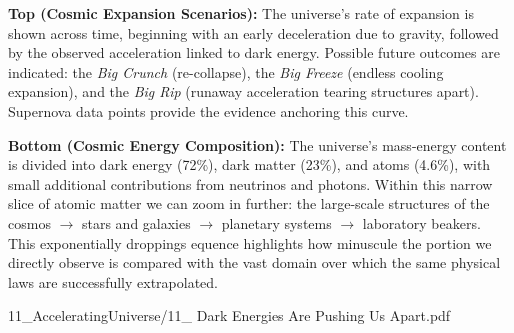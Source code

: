\begin{SideNotePage}{
  \textbf{Top (Cosmic Expansion Scenarios):} The universe’s rate of expansion is shown across time, beginning with an early deceleration due to gravity, followed by the observed acceleration linked to dark energy. Possible future outcomes are indicated: the \emph{Big Crunch} (re-collapse), the \emph{Big Freeze} (endless cooling expansion), and the \emph{Big Rip} (runaway acceleration tearing structures apart). Supernova data points provide the evidence anchoring this curve. \par
  \textbf{Bottom (Cosmic Energy Composition):} The universe’s mass-energy content is divided into dark energy (72\%), dark matter (23\%), and atoms (4.6\%), with small additional contributions from neutrinos and photons. Within this narrow slice of atomic matter we can zoom in further: the large-scale structures of the cosmos \(\to\) stars and galaxies \(\to\) planetary systems \(\to\) laboratory beakers. This exponentially droppings equence highlights how minuscule the portion we directly observe is compared with the vast domain over which the same physical laws are successfully extrapolated. \par

}{11_AcceleratingUniverse/11_ Dark Energies Are Pushing Us Apart.pdf}
\end{SideNotePage}
